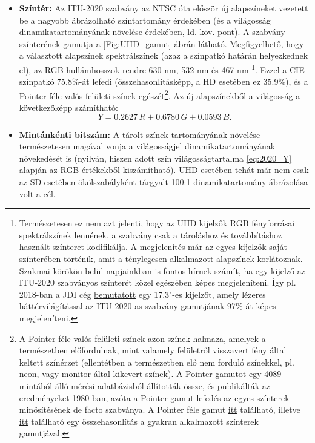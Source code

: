 \begin{itemize}
\item \textbf{Színtér:} Az ITU-2020 szabvány az NTSC óta először új alapszíneket vezetett be a nagyobb ábrázolható színtartomány érdekében (és a világosság dinamikatartományának növelése érdekében, ld. köv. pont).
A szabvány színterének gamutja a \ref{Fig:UHD_gamut} ábrán látható.
Megfigyelhető, hogy a választott alapszínek spektrálszínek (azaz a színpatkó határán helyezkednek el), az RGB hullámhosszok rendre 630 nm, 532 nm és 467 nm
\footnote{Természetesen ez nem azt jelenti, hogy az UHD kijelzők RGB fényforrásai spektrálszínek lennének, a szabvány csak a tároláshoz és továbbításhoz használt színteret kodifikálja. 
A megjelenítés már az egyes kijelzők saját színterében történik, amit a ténylegesen alkalmazott alapszínek korlátoznak.
Szakmai körökön belül napjainkban is fontos hírnek számít, ha egy kijelző az ITU-2020 szabványos színterét közel egészében képes megjeleníteni.
Így pl. 2018-ban a JDI cég \href{https://www.displaydaily.com/?view=article&id=62235:jdi-may-have-commercial-problems-but-has-technical-highlights}{bemutatott} egy 17.3"-es kijelzőt, amely lézeres háttérvilágítással az ITU-2020-as szabvány gamutjának 97\%-át képes megjeleníteni.}.
Ezzel a CIE színpatkó 75.8\%-át lefedi (összehasonlításképp, a HD esetében ez 35.9\%), és a Pointer féle valós felületi színek egészét\footnote{
A Pointer féle valós felületi színek azon színek halmaza, amelyek a természetben előfordulnak, mint valamely felületről visszavert fény által keltett színérzet (ellentétben a természetben elő nem forduló színekkel, pl. neon, vagy monitor által kikevert színek).
A Pointer gamutot egy 4089 mintából álló mérési adatbázisból állították össze, és publikálták az eredményeket 1980-ban, azóta a Pointer gamut-lefedés az egyes színterek minősítésének de facto szabványa.
A Pointer féle gamut \href{https://cinepedia.com/picture/color-gamut/}{itt} található, illetve \href{https://www.tftcentral.co.uk/articles/pointers_gamut.htm}{itt} található egy összehasonlítás a gyakran alkalmazott színterek gamutjával.
}.
Az új alapszínekből a világosság a következőképp számítható:
\begin{equation}
Y = 0.2627 \, R + 0.6780 \, G + 0.0593 \, B.
\label{eq:2020_Y}
\end{equation}
\item \textbf{Mintánkénti bitszám:} A tárolt színek tartományának növelése természetesen magával vonja a világosságjel dinamikatartományának növekedését is (nyilván, hiszen adott szín világosságtartalma \ref{eq:2020_Y} alapján az RGB értékekből kiszámítható).
UHD esetében  tehát már nem csak az SD esetében ökölszabályként tárgyalt 100:1 dinamikatartomány ábrázolása volt a cél.

\end{itemize}
